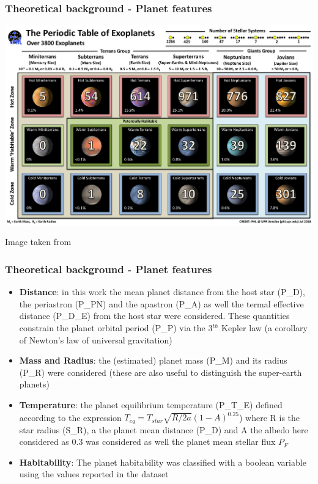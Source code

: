 \documentclass[compress]{beamer}
\begin{document}
\begin{frame}
\frametitle{Theoretical background - Planet features }
\begin{center}
\includegraphics[width=.9\linewidth,]{Pic/PT_Confirmed.jpg}
\end{center}
\begin{center}
Image taken from \cite{exoplanets-catalog}
\end{center}
\end{frame}


\begin{frame}
\frametitle{Theoretical background - Planet features }
\begin{itemize}
\item\textbf{Distance}: in this work the mean planet distance from the host star (P\_D), the periastron (P\_PN) and the apastron (P\_A) as well the termal effective distance (P\_D\_E) from the host star  were considered. These quantities constrain the planet orbital period (P\_P) via the 3$^{th}$ Kepler law (a corollary of Newton's law of universal gravitation)
\item\textbf{Mass and Radius}: the (estimated) planet mass (P\_M) and its radius (P\_R) were considered (these are also useful to distinguish the super-earth planets) 
\item\textbf{Temperature}: the planet equilibrium temperature (P\_T\_E) defined according to the expression $T_{eq}=T_{star}\sqrt{R/2a}\left(1-A\right)^{0.25}$) where R is the star radius (S\_R), a the planet mean distance (P\_D) and A the albedo here considered as 0.3 was considered as well the planet mean stellar flux $P_F$ 
\item\textbf{Habitability}: The planet habitability was classified with a boolean variable using the values reported in the dataset \cite{planet_dataset}

\end{itemize}
\end{frame}
\end{document}
